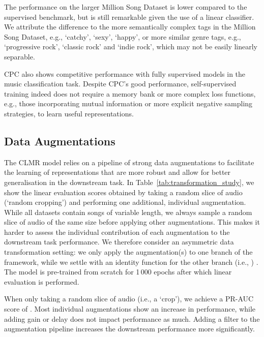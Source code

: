 \documentclass{article}
\begin{document}
The performance on the larger Million Song Dataset is lower compared to the supervised benchmark, but is still remarkable given the use of a linear classifier.
We attribute the difference to the more semantically complex tags in the Million Song Dataset, e.g., `catchy', `sexy', `happy', or more similar genre tags, e.g., `progressive rock', `classic rock' and `indie rock', which may not be easily linearly separable.

CPC also shows competitive performance with fully supervised models in the music classification task.
Despite CPC's good performance, self-supervised training indeed does not require a memory bank or more complex loss functions, e.g., those incorporating mutual information or more explicit negative sampling strategies, to learn useful representations.


\subsection{Data Augmentations}
\label{sec:data_augmentations}
The CLMR model relies on a pipeline of strong data augmentations to facilitate the learning of representations that are more robust and allow for better generalisation in the downstream task.
In Table~\ref{tab:transformation_study}, we show the linear
evaluation scores obtained by taking a random slice of audio (`random cropping') and performing one additional, individual augmentation.
While all datasets contain songs of variable length, we always sample a random slice of audio of the same size before applying other augmentations.
This makes it harder to assess the individual contribution of each augmentation to the downstream task performance.
We therefore consider an asymmetric data transformation setting: we only apply the augmentation(s) to one branch of the framework, while we settle with an identity function for the other branch (i.e., ) \cite{chen_simple_2020}.
The model is pre-trained from scratch for 1\,000 epochs after which linear evaluation is performed.

When only taking a random slice of audio (i.e., a `crop'), we achieve a PR-AUC score of .
Most individual augmentations show an increase in performance, while adding gain or delay does not impact performance as much.
Adding a filter to the augmentation pipeline increases the downstream performance more significantly.
\end{document}
